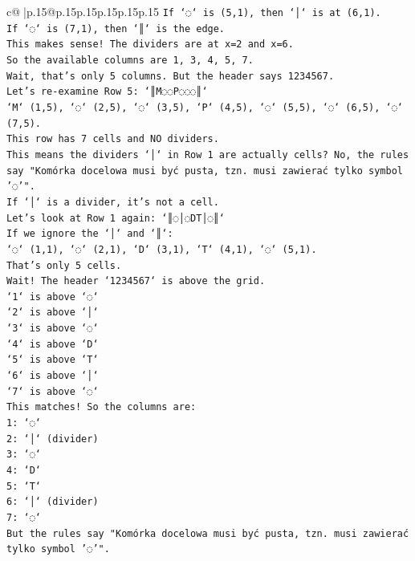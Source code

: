 \documentclass{article}
\begin{document}
{\begin{supertabular}{c@{$\;$}|p{.15\linewidth}@{}p{.15\linewidth}p{.15\linewidth}p{.15\linewidth}p{.15\linewidth}p{.15\linewidth}}
{{{\texttt{If `◌` is (5,1), then `│` is at (6,1).} \\
\texttt{If `◌` is (7,1), then `║` is the edge.} \\
\texttt{This makes sense! The dividers are at x=2 and x=6.} \\
\texttt{So the available columns are 1, 3, 4, 5, 7.} \\
\texttt{Wait, that's only 5 columns. But the header says 1234567.} \\
\texttt{Let's re{-}examine Row 5: `║M◌◌P◌◌◌║`} \\
\texttt{`M` (1,5), `◌` (2,5), `◌` (3,5), `P` (4,5), `◌` (5,5), `◌` (6,5), `◌` (7,5).} \\
\texttt{This row has 7 cells and NO dividers.} \\
\texttt{This means the dividers `│` in Row 1 are actually cells? No, the rules say "Komórka docelowa musi być pusta, tzn. musi zawierać tylko symbol '◌'".} \\
\texttt{If `│` is a divider, it's not a cell.} \\
\texttt{Let's look at Row 1 again: `║◌│◌DT│◌║`} \\
\texttt{If we ignore the `│` and `║`:} \\
\texttt{`◌` (1,1), `◌` (2,1), `D` (3,1), `T` (4,1), `◌` (5,1).} \\
\texttt{That's only 5 cells.} \\
\texttt{Wait! The header `1234567` is above the grid.} \\
\texttt{`1` is above `◌`} \\
\texttt{`2` is above `│`} \\
\texttt{`3` is above `◌`} \\
\texttt{`4` is above `D`} \\
\texttt{`5` is above `T`} \\
\texttt{`6` is above `│`} \\
\texttt{`7` is above `◌`} \\
\texttt{This matches! So the columns are:} \\
\texttt{1: `◌`} \\
\texttt{2: `│` (divider)} \\
\texttt{3: `◌`} \\
\texttt{4: `D`} \\
\texttt{5: `T`} \\
\texttt{6: `│` (divider)} \\
\texttt{7: `◌`} \\
\texttt{But the rules say "Komórka docelowa musi być pusta, tzn. musi zawierać tylko symbol '◌'".} \\
}}}
\end{supertabular}}
\end{document}
